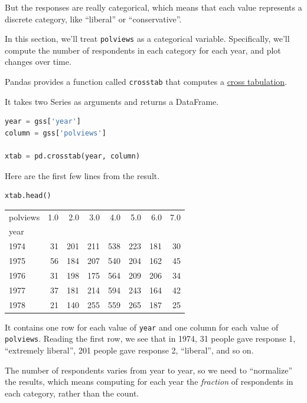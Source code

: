 But the responses are really categorical, which means that each value
represents a discrete category, like ``liberal'' or ``conservative''.

In this section, we'll treat \passthrough{\lstinline!polviews!} as a
categorical variable. Specifically, we'll compute the number of
respondents in each category for each year, and plot changes over time.

Pandas provides a function called \passthrough{\lstinline!crosstab!}
that computes a
\href{https://en.wikipedia.org/wiki/Contingency_table}{cross
tabulation}.

It takes two Series as arguments and returns a DataFrame.

\begin{lstlisting}[language=Python,style=source]
year = gss['year']
column = gss['polviews']

xtab = pd.crosstab(year, column)
\end{lstlisting}

Here are the first few lines from the result.

\begin{lstlisting}[language=Python,style=source]
xtab.head()
\end{lstlisting}

\begin{tabular}{lrrrrrrr}
\toprule
polviews &  1.0 &  2.0 &  3.0 &  4.0 &  5.0 &  6.0 &  7.0 \\
year &      &      &      &      &      &      &      \\
\midrule
1974 &   31 &  201 &  211 &  538 &  223 &  181 &   30 \\
1975 &   56 &  184 &  207 &  540 &  204 &  162 &   45 \\
1976 &   31 &  198 &  175 &  564 &  209 &  206 &   34 \\
1977 &   37 &  181 &  214 &  594 &  243 &  164 &   42 \\
1978 &   21 &  140 &  255 &  559 &  265 &  187 &   25 \\
\bottomrule
\end{tabular}

It contains one row for each value of \passthrough{\lstinline!year!} and
one column for each value of \passthrough{\lstinline!polviews!}. Reading
the first row, we see that in 1974, 31 people gave response 1,
``extremely liberal'', 201 people gave response 2, ``liberal'', and so
on.

The number of respondents varies from year to year, so we need to
``normalize'' the results, which means computing for each year the
\emph{fraction} of respondents in each category, rather than the count.

